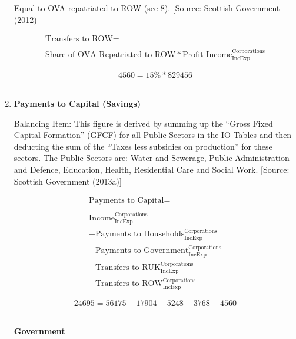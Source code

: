 \begin{enumerate}
Equal to OVA repatriated to ROW (see 8). [Source: Scottish Government (2012)]

\begin{equation}
\begin{split}
\text{Transfers to ROW} =  \\ \\
\text{Share of OVA Repatriated to ROW}*\text{Profit Income}^\text{Corporations}_\text{IncExp}
\end{split} \label{eq:2.5.32}
\end{equation}

\begin{equation} \nonumber
4560 = 15\%*829456
\end{equation}\\


\item \textbf {Payments to Capital (Savings)}

Balancing Item: This figure is derived by summing up the “Gross Fixed Capital Formation” (GFCF) for all Public Sectors in the IO Tables and then deducting the sum of the “Taxes less subsidies on production” for these sectors. The Public Sectors are: Water and Sewerage, Public Administration and Defence, Education, Health, Residential Care and Social Work. [Source: Scottish Government (2013a)]

\begin{equation}
\begin{split}
\text{Payments to Capital} =  \\ \\
\text{Income}^\text{Corporations}_\text{IncExp}\\
-\text{Payments to Households}^\text{Corporations}_\text{IncExp}\\
-\text{Payments to Government}^\text{Corporations}_\text{IncExp}\\
-\text{Transfers to RUK}^\text{Corporations}_\text{IncExp}\\
-\text{Transfers to ROW}^\text{Corporations}_\text{IncExp}
\end{split} \label{eq:2.5.33}
\end{equation}

\begin{equation} \nonumber
24695 = 56175-17904-5248-3768-4560
\end{equation}\\


\pagebreak

\begin{center}
\textbf{\LARGE Government}
\end{center}


\end{enumerate}

